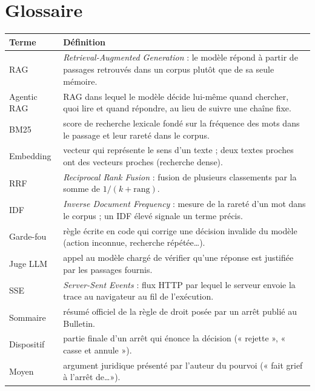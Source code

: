 \documentclass[11pt,a4paper]{article}
\begin{document}
\section{Glossaire}
\begin{center}\small
\begin{tabularx}{\textwidth}{@{}l X@{}}
\toprule
Terme & Définition \\ \midrule
RAG & \emph{Retrieval-Augmented Generation} : le modèle répond à partir de passages retrouvés dans un corpus plutôt que de sa seule mémoire. \\
Agentic RAG & RAG dans lequel le modèle décide lui-même quand chercher, quoi lire et quand répondre, au lieu de suivre une chaîne fixe. \\
BM25 & score de recherche lexicale fondé sur la fréquence des mots dans le passage et leur rareté dans le corpus. \\
Embedding & vecteur qui représente le sens d'un texte ; deux textes proches ont des vecteurs proches (recherche dense). \\
RRF & \emph{Reciprocal Rank Fusion} : fusion de plusieurs classements par la somme de $1/(k+\text{rang})$. \\
IDF & \emph{Inverse Document Frequency} : mesure de la rareté d'un mot dans le corpus ; un IDF élevé signale un terme précis. \\
Garde-fou & règle écrite en code qui corrige une décision invalide du modèle (action inconnue, recherche répétée\ldots). \\
Juge LLM & appel au modèle chargé de vérifier qu'une réponse est justifiée par les passages fournis. \\
SSE & \emph{Server-Sent Events} : flux HTTP par lequel le serveur envoie la trace au navigateur au fil de l'exécution. \\
Sommaire & résumé officiel de la règle de droit posée par un arrêt publié au Bulletin. \\
Dispositif & partie finale d'un arrêt qui énonce la décision (« rejette », « casse et annule »). \\
Moyen & argument juridique présenté par l'auteur du pourvoi (« fait grief à l'arrêt de\ldots »). \\
\bottomrule
\end{tabularx}
\end{center}
\end{document}
